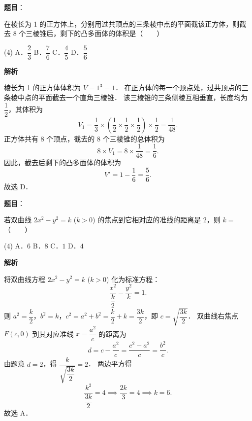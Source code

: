 \begin{answer}

\textbf{题目}：

在棱长为 1 的正方体上，分别用过共顶点的三条棱中点的平面截该正方体，则截去 8 个三棱锥后，剩下的凸多面体的体积是\mbox{（　　）}

\begin{gkopts}(4)
\task A．$\dfrac{2}{3}$
\task B．$\dfrac{7}{6}$
\task C．$\dfrac{4}{5}$
\task D．$\dfrac{5}{6}$
\end{gkopts}

\textbf{解析}

棱长为 1 的正方体体积为 $V = 1^3 = 1$．
在正方体的每一个顶点处，过共顶点的三条棱中点的平面截去一个直角三棱锥．
该三棱锥的三条侧棱互相垂直，长度均为 $\dfrac{1}{2}$，其体积为
\nopagebreak[4]
\[
V_1 = \dfrac{1}{3} \times \left(\dfrac{1}{2} \times \dfrac{1}{2} \times \dfrac{1}{2}\right) \times \dfrac{1}{2} = \dfrac{1}{48}.
\]
正方体共有 8 个顶点，截去的 8 个三棱锥的总体积为
\nopagebreak[4]
\[
8 \times V_1 = 8 \times \dfrac{1}{48} = \dfrac{1}{6}.
\]
因此，截去后剩下的凸多面体的体积为
\nopagebreak[4]
\[
V' = 1 - \dfrac{1}{6} = \dfrac{5}{6}.
\]
故选 D．


\end{answer}
\begin{answer}

\textbf{题目}：

若双曲线 $2x^2 - y^2 = k$ ($k > 0$) 的焦点到它相对应的准线的距离是 2，则 $k =$\mbox{（　　）}

\begin{gkopts}(4)
\task A．$6$
\task B．$8$
\task C．$1$
\task D．$4$
\end{gkopts}

\textbf{解析}

将双曲线方程 $2x^2 - y^2 = k$ ($k > 0$) 化为标准方程：
\nopagebreak[4]
\[
\dfrac{x^2}{\dfrac{k}{2}} - \dfrac{y^2}{k} = 1.
\]
则 $a^2 = \dfrac{k}{2}$，$b^2 = k$，$c^2 = a^2 + b^2 = \dfrac{k}{2} + k = \dfrac{3k}{2}$，即 $c = \sqrt{\dfrac{3k}{2}}$．
双曲线右焦点 $F(c, 0)$ 到其对应准线 $x = \dfrac{a^2}{c}$ 的距离为
\nopagebreak[4]
\[
d = c - \dfrac{a^2}{c} = \dfrac{c^2 - a^2}{c} = \dfrac{b^2}{c}.
\]
由题意 $d = 2$，得 $\dfrac{k}{\sqrt{\dfrac{3k}{2}}} = 2$．
两边平方得
\nopagebreak[4]
\[
\dfrac{k^2}{\dfrac{3k}{2}} = 4 \implies \dfrac{2k}{3} = 4 \implies k = 6.
\]
故选 A．


\end{answer}
